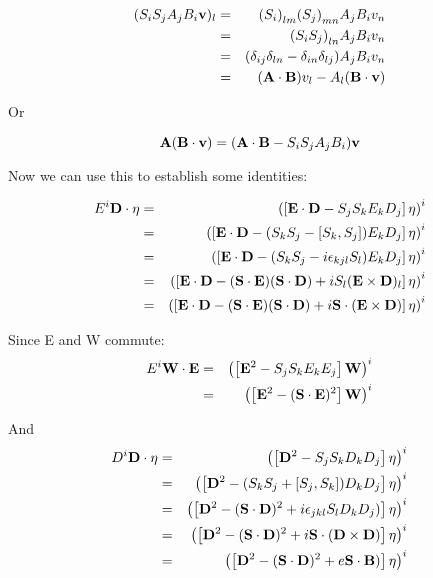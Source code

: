 \begin{eqnarray*}
(S_i S_j A_j B_i \mathbf{v} )_l 
	&=&  	{(S_i)}_{lm} {(S_j)}_{mn} A_j B_i v_n \\
	&=&	{(S_iS_j)}_{ln} A_j B_i v_n \\
	&=&	 (\delta_{ij} \delta_{ln} - \delta_{in} \delta_{lj} ) A_j B_i v_n \\
	&=&	(\mathbf{A} \cdot \mathbf{B}) v_l  - A_l ( \mathbf{B} \cdot \mathbf{v}) \\
\end{eqnarray*}

Or 

$$ \mathbf{A} (\mathbf{B} \cdot \mathbf{v}) =  (\mathbf{A} \cdot \mathbf{B}   -  S_i S_j A_j B_i) \mathbf{v} $$

Now we can use this to establish some identities:

\begin{eqnarray*}
 E^i \mathbf{D} \cdot \mathbf{\eta}
	&=&	\left( \left[\mathbf{E} \cdot \mathbf{D}  - S_j S_k E_k D_j\right] \mathbf{\eta} \right)^i		\\
	&=&	\left( \left[\mathbf{E} \cdot \mathbf{D}  - (S_k S_j  - [S_k, S_j] ) E_k D_j \right] \mathbf{\eta} \right)^i \\
	&=&	\left( \left[\mathbf{E} \cdot \mathbf{D}  - (S_k S_j - i \epsilon_{kjl} S_l ) E_k D_j \right] \mathbf{\eta} \right)^i	  \\
	&=&	\left( \left[\mathbf{E} \cdot \mathbf{D}  - (\mathbf{S} \cdot \mathbf{E})( \mathbf{S} \cdot \mathbf{D}) +  i  S_l (\mathbf{E} \times \mathbf{D})_l \right] \mathbf{\eta} \right)^i	  \\
	&=&	\left( \left[\mathbf{E} \cdot \mathbf{D}  - (\mathbf{S} \cdot \mathbf{E})( \mathbf{S} \cdot \mathbf{D}) +  i  \mathbf{S} \cdot (\mathbf{E} \times \mathbf{D})\right] \mathbf{\eta} \right)^i
\end{eqnarray*}

Since E and W commute:
\begin{eqnarray*}
 E^i \mathbf{W} \cdot \mathbf{E}
	&=& \left( \left[\mathbf{E}^2  - S_j S_k E_k E_j\right] \mathbf{W} \right)^i		\\
	&=& \left( \left[\mathbf{E}^2  - (\mathbf{S} \cdot \mathbf{E} )^2 \right] \mathbf{W} \right)^i		\\
\end{eqnarray*}

And
\begin{eqnarray*}
 D^i \mathbf{D} \cdot \mathbf{\eta}
	&=& \left( \left[\mathbf{D}^2  - S_j S_k D_k D_j\right] \mathbf{\eta} \right)^i		\\
	&=& \left( \left[\mathbf{D}^2  - (S_k S_j + [S_j, S_k]) D_k D_j\right] \mathbf{\eta} \right)^i		\\
	&=& \left( \left[\mathbf{D}^2  - (\mathbf{S} \cdot \mathbf{D})^2 + i\epsilon_{jkl} S_l D_k D_j )\right] \mathbf{\eta} \right)^i		\\
	&=& \left( \left[\mathbf{D}^2  - (\mathbf{S} \cdot \mathbf{D})^2 + i\mathbf{S} \cdot (\mathbf{D} \times \mathbf{D})  \right] \mathbf{\eta} \right)^i		\\
	&=& \left( \left[\mathbf{D}^2  - (\mathbf{S} \cdot \mathbf{D})^2 + e \mathbf{S} \cdot \mathbf{B})  \right] \mathbf{\eta} \right)^i		\\
\end{eqnarray*}

